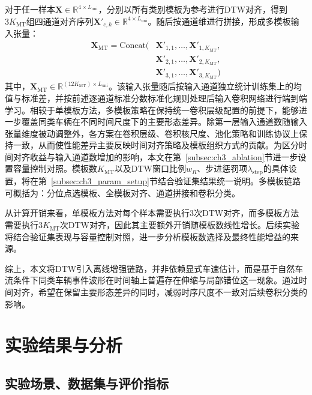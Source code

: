 \documentclass{xdupgthesis}
\begin{document}
对于任一样本$\mathbf{X}\in\mathbb{R}^{4\times L_{\mathrm{uni}}}$，分别以所有类别模板为参考进行DTW对齐，得到$3K_{\mathrm{MT}}$组四通道对齐序列$\mathbf{X}'_{c,k}\in\mathbb{R}^{4\times L_{\mathrm{uni}}}$。随后按通道维进行拼接，形成多模板输入张量：
\begin{equation}
    \begin{aligned}
    \mathbf{X}_{\mathrm{MT}}=\mathrm{Concat}\big(
    &\mathbf{X}'_{1,1},\ldots,\mathbf{X}'_{1,K_{\mathrm{MT}}},\\
    &\mathbf{X}'_{2,1},\ldots,\mathbf{X}'_{2,K_{\mathrm{MT}}},\\
    &\mathbf{X}'_{3,1},\ldots,\mathbf{X}'_{3,K_{\mathrm{MT}}}
    \big)
    \end{aligned}
\end{equation}
其中，$\mathbf{X}_{\mathrm{MT}}\in\mathbb{R}^{(12K_{\mathrm{MT}})\times L_{\mathrm{uni}}}$。该输入张量随后按输入通道独立统计训练集上的均值与标准差，并按前述逐通道标准分数标准化规则处理后输入卷积网络进行端到端学习。相较于单模板方法，多模板策略在保持统一卷积层级配置的前提下，能够进一步覆盖同类车辆在不同时间尺度下的主要形态差异。除第一层输入通道数随输入张量维度被动调整外，各方案在卷积层级、卷积核尺度、池化策略和训练协议上保持一致，从而使性能差异主要反映时间对齐策略及模板组织方式的贡献。为区分时间对齐收益与输入通道数增加的影响，本文在第~\ref{subsec:ch3_ablation}节进一步设置容量控制对照。模板数$K_{\mathrm{MT}}$以及DTW窗口比例$w_R$、步进惩罚项$\lambda_{\mathrm{step}}$的具体设置，将在第~\ref{subsec:ch3_param_setup}节结合验证集结果统一说明。多模板链路可概括为：分位点选模板、全模板对齐、通道拼接和卷积分类。

从计算开销来看，单模板方法对每个样本需要执行3次DTW对齐，而多模板方法需要执行$3K_{\mathrm{MT}}$次DTW对齐，因此其主要额外开销随模板数线性增长。后续实验将结合验证集表现与容量控制对照，进一步分析模板数选择及最终性能增益的来源。

综上，本文将DTW引入离线增强链路，并非依赖显式车速估计，而是基于自然车流条件下同类车辆事件波形在时间轴上普遍存在伸缩与局部错位这一现象。通过时间对齐，希望在保留主要形态差异的同时，减弱时序尺度不一致对后续卷积分类的影响。


\section{实验结果与分析}
\label{sec:ch3_exp}

\subsection{实验场景、数据集与评价指标}
\label{subsec:ch3_dataset_eval}
\end{document}

